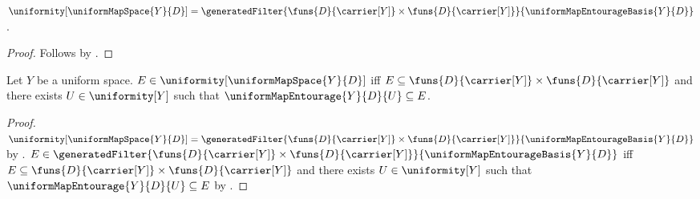 \begin{proposition}\label{uniform_map_space_uniformity}
    $\uniformity[\uniformMapSpace{Y}{D}]=
        \generatedFilter
            {\funs{D}{\carrier[Y]}\times\funs{D}{\carrier[Y]}}
            {\uniformMapEntourageBasis{Y}{D}}$.
\end{proposition}
\begin{proof}
    Follows by
        .
\end{proof}

\begin{proposition}\label{uniform_map_space_uniformity_iff}
    Let $Y$ be a uniform space.
    $E\in\uniformity[\uniformMapSpace{Y}{D}]$ iff
        $E\subseteq\funs{D}{\carrier[Y]}\times\funs{D}{\carrier[Y]}$ and
        there exists $U\in\uniformity[Y]$ such that
            $\uniformMapEntourage{Y}{D}{U}\subseteq E$.
\end{proposition}
\begin{proof}
    $\uniformity[\uniformMapSpace{Y}{D}]=
        \generatedFilter
            {\funs{D}{\carrier[Y]}\times\funs{D}{\carrier[Y]}}
            {\uniformMapEntourageBasis{Y}{D}}$ by
        .
    $E\in\generatedFilter
            {\funs{D}{\carrier[Y]}\times\funs{D}{\carrier[Y]}}
            {\uniformMapEntourageBasis{Y}{D}}$ iff
        $E\subseteq\funs{D}{\carrier[Y]}\times\funs{D}{\carrier[Y]}$ and
        there exists $U\in\uniformity[Y]$ such that
            $\uniformMapEntourage{Y}{D}{U}\subseteq E$ by
        .
\end{proof}
